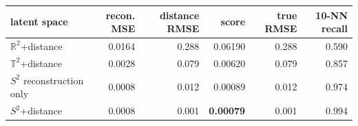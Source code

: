 \begin{tabular}{lrrrrr}
\toprule
latent space & recon. MSE & distance RMSE & score & true RMSE & 10-NN recall \\
\midrule
$\mathbb{R}^2$+distance & 0.0164 & 0.288 & 0.06190 & 0.288 & 0.590 \\
$\mathbb{T}^2$+distance & 0.0028 & 0.079 & 0.00620 & 0.079 & 0.857 \\
$S^2$ reconstruction only & 0.0008 & 0.012 & 0.00089 & 0.012 & 0.974 \\
$S^2$+distance & 0.0008 & 0.001 & \textbf{0.00079} & 0.001 & 0.994 \\
\bottomrule
\end{tabular}
